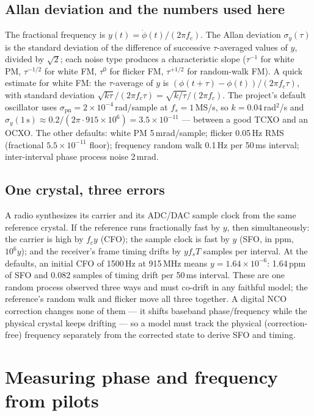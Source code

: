 \documentclass[10pt]{article}
\begin{document}
\subsection{Allan deviation and the numbers used here}
The fractional frequency is $y(t)=\dot\phi(t)/(2\pi f_c)$. The Allan
deviation $\sigma_y(\tau)$ is the standard deviation of the difference of
successive $\tau$-averaged values of $y$, divided by $\sqrt2$; each noise
type produces a characteristic slope ($\tau^{-1}$ for white PM,
$\tau^{-1/2}$ for white FM, $\tau^{0}$ for flicker FM, $\tau^{+1/2}$ for
random-walk FM). A quick estimate for white FM: the $\tau$-average of $y$
is $(\phi(t{+}\tau)-\phi(t))/(2\pi f_c\tau)$, with standard deviation
$\sqrt{k\tau}/(2\pi f_c\tau)=\sqrt{k/\tau}/(2\pi f_c)$. The project's
default oscillator uses $\sigma_{\mathrm{pn}}=2\times10^{-4}$\,rad/sample
at $f_s=1$\,MS/s, so $k=0.04$\,rad$^2$/s and
$\sigma_y(1\,\mathrm{s})\approx0.2/(2\pi\cdot915\times10^6)=3.5\times10^{-11}$
--- between a good TCXO and an OCXO. The other defaults: white PM
5\,mrad/sample; flicker 0.05\,Hz RMS (fractional $5.5\times10^{-11}$
floor); frequency random walk 0.1\,Hz per 50\,ms interval; inter-interval
phase process noise 2\,mrad.

\subsection{One crystal, three errors}
A radio synthesizes its carrier and its ADC/DAC sample clock from the
same reference crystal. If the reference runs fractionally fast by $y$,
then simultaneously: the carrier is high by $f_c y$ (CFO); the sample
clock is fast by $y$ (SFO, in ppm, $10^6 y$); and the receiver's frame
timing drifts by $y f_s T$ samples per interval. At the defaults, an
initial CFO of 1500\,Hz at 915\,MHz means $y=1.64\times10^{-6}$: 1.64\,ppm
of SFO and 0.082 samples of timing drift per 50\,ms interval. These are
one random process observed three ways and must co-drift in any faithful
model; the reference's random walk and flicker move all three together.
A digital NCO correction changes none of them --- it shifts baseband
phase/frequency while the physical crystal keeps drifting --- so a model
must track the physical (correction-free) frequency separately from the
corrected state to derive SFO and timing.

\section{Measuring phase and frequency from pilots}
\label{sec:measure}
\end{document}
